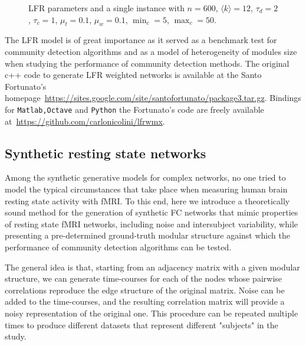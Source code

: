 \documentclass[11pt,              a4paper,              twoside,openright,              titlepage,              headinclude,footinclude,                            numbers=noenddot,              cleardoublepage=empty,]{scrreprt}
\begin{document}
\begin{figure}[htb!]
\begin{footnotesize}
\begin{minipage}[b!]{0.35\textwidth}
\end{minipage}
\end{footnotesize}
\caption{LFR parameters and a single instance with $n=600$, $\langle k \rangle =12$, $\tau_d=2$, $\tau_c=1$, $\mu_t=0.1$, $\mu_w=0.1$, $\min_c=5$, $\max_c=50$.}
\label{tab:lfrparams}
\end{figure}
The LFR model is of great importance as it served as a benchmark test for community detection algorithms and as a model of heterogeneity of modules size when studying the performance of community detection methods. The original c++ code to generate LFR weighted networks is available at the Santo Fortunato's homepage~\url{https://sites.google.com/site/santofortunato/package3.tar.gz}.
Bindings for \texttt{Matlab,Octave} and \texttt{Python} the Fortunato's code are freely available at~\url{https://github.com/carlonicolini/lfrwmx}.




\subsection{Synthetic resting state networks}
Among the synthetic generative models for complex networks, no one tried to model the typical circumstances that take place when measuring human brain resting state activity with fMRI. To this end, here we introduce a theoretically sound method for the generation of synthetic FC networks that mimic properties of resting state fMRI networks, including noise and intersubject variability, while presenting a pre-determined ground-truth modular structure against which the performance of community detection algorithms can be tested.

The general idea is that, starting from an adjacency matrix with a given modular structure, we can generate time-courses for each of the nodes whose pairwise correlations reproduce the edge structure of the original matrix. Noise can be added to the time-courses, and the resulting correlation matrix will provide a noisy representation of the original one. This procedure can be repeated multiple times to produce different datasets that represent different "subjects" in the study.
\end{document}
